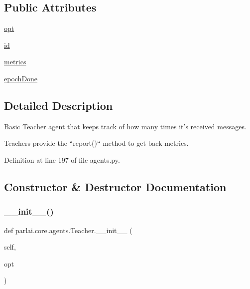 \subsection*{Public Attributes}
\begin{DoxyCompactItemize}
\item 
\hyperlink{classparlai_1_1core_1_1agents_1_1Teacher_a3ce6243860ce978a897922863ed32fa4}{opt}
\item 
\hyperlink{classparlai_1_1core_1_1agents_1_1Teacher_a8385159acf54471fee8887ba2a83b53c}{id}
\item 
\hyperlink{classparlai_1_1core_1_1agents_1_1Teacher_a159705efe2a9f389d8adfdad76891f08}{metrics}
\item 
\hyperlink{classparlai_1_1core_1_1agents_1_1Teacher_a2a21915f2270b76ba0e99137d506af89}{epoch\+Done}
\end{DoxyCompactItemize}


\subsection{Detailed Description}
\begin{DoxyVerb}Basic Teacher agent that keeps track of how many times it's received messages.

Teachers provide the ``report()`` method to get back metrics.
\end{DoxyVerb}
 

Definition at line 197 of file agents.\+py.



\subsection{Constructor \& Destructor Documentation}
\mbox{\label{classparlai_1_1core_1_1agents_1_1Teacher_a0ce9f4d0810bbd359c35572c05194167}} 
\subsubsection{\texorpdfstring{\+\_\+\+\_\+init\+\_\+\+\_\+()}{\_\_init\_\_()}}
{\footnotesize\ttfamily def parlai.\+core.\+agents.\+Teacher.\+\_\+\+\_\+init\+\_\+\+\_\+ (\begin{DoxyParamCaption}\item[{}]{self,  }\item[{}]{opt }\end{DoxyParamCaption})}



